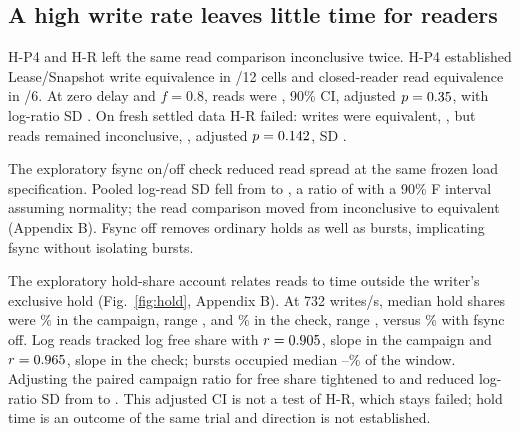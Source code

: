\documentclass[conference]{IEEEtran}
\newif\ifwithappendix\withappendixtrue
\begin{document}
\subsection{A high write rate leaves little time for readers}
\label{sec:highwrite}
H-P4 and H-R left the same read comparison inconclusive twice. H-P4 established Lease/Snapshot write equivalence in \PacedHPFourWCount{}/12 cells and closed-reader read equivalence in \PacedHPFourRCount{}/6. At zero delay and $f=0.8$, reads were \PacedReadException{}, 90\% CI, adjusted $p=0.35$, with log-ratio SD \PacedReadExceptionSD{}. On fresh settled data H-R failed: writes were equivalent, \SettledHRWrite{}, but reads remained inconclusive, \SettledHRRead{}, adjusted $p=0.142$, SD \SettledHRReadSD{}.

The exploratory fsync on/off check reduced read spread at the same frozen load specification. Pooled log-read SD fell from \FsyncPooledOn{} to \FsyncPooledOff{}, a ratio of \FsyncSdRatio{} with a 90\% F interval assuming normality; the read comparison moved from inconclusive to equivalent (Appendix B). Fsync off removes ordinary holds as well as bursts, implicating fsync without isolating bursts.

The exploratory hold-share account relates reads to time outside the writer's exclusive hold\ifwithappendix{} (Fig.~\ref{fig:hold}, Appendix B)\fi. At 732 writes/s, median hold shares were \HoldSettledMedian{}\% in the campaign, range \HoldSettledRange{}, and \HoldOnMedian{}\% in the check, range \HoldOnRange{}, versus \HoldOff{}\% with fsync off. Log reads tracked log free share with $r=0.905$, slope \HoldSettledSlope{} in the campaign and $r=0.965$, slope \HoldOnSlope{} in the check; bursts occupied median \HoldBurstOn{}--\HoldBurstSettled{}\% of the window. Adjusting the paired campaign ratio for free share tightened \SettledHRRead{} to \HoldAdjSettled{} and reduced log-ratio SD from \SettledHRReadSD{} to \HoldAdjSettledSD{}. This adjusted CI is not a test of H-R, which stays failed; hold time is an outcome of the same trial and direction is not established.
\end{document}
